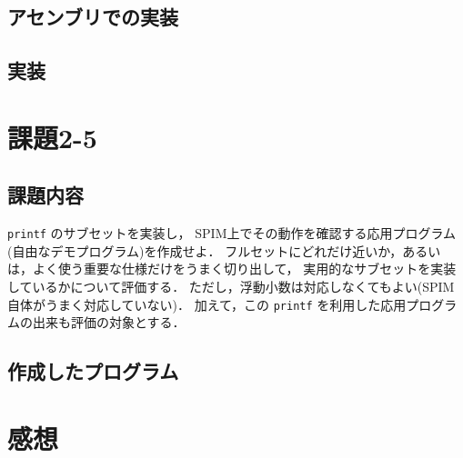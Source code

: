 \documentclass[a4j,11pt]{jarticle}
\begin{document}
\subsection{アセンブリでの実装}

\subsection{実装}

\section{課題2-5}

\subsection{課題内容}

{\tt printf} のサブセットを実装し， SPIM上でその動作を確認する応用プログラム(自由なデモプログラム)を作成せよ． 
フルセットにどれだけ近いか，あるいは，よく使う重要な仕様だけをうまく切り出して， 
実用的なサブセットを実装しているかについて評価する． 
ただし，浮動小数は対応しなくてもよい(SPIM自体がうまく対応していない)． 
加えて，この {\tt printf} を利用した応用プログラムの出来も評価の対象とする．


\subsection{作成したプログラム}



\section{感想}
\end{document}
